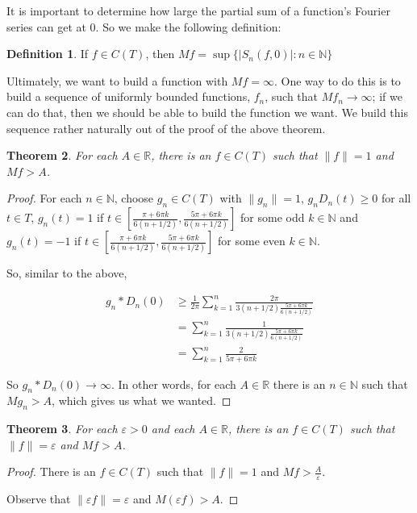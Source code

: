 \documentclass{amsart}
\newcommand{\vep}{\varepsilon}
\newcommand{\N}{\mathbb{N}}
\newcommand{\R}{\mathbb{R}}
\newcommand{\absval}[1]{\left| #1 \right|}
\newcommand{\norm}[1]{\|#1\|}
\newtheorem{thm}{Theorem}[section]
\theoremstyle{definition}
\newtheorem{definition}[thm]{Definition}
\begin{document}
It is important to determine how large the partial sum of a function's Fourier series can get at $0$. 
So we make the following definition:

\begin{definition}
If $f \in C(T)$, then $Mf = \sup\{\absval{S_n(f,0)} : n \in \N\}$ 
\end{definition}

Ultimately, we want to build a function with $Mf = \infty$.
One way to do this is to build a sequence of uniformly bounded functions, $f_n$, such that $Mf_n \to \infty$; 
if we can do that, then we should be able to build the function we want.
We build this sequence rather naturally out of the proof of the above theorem.

\begin{thm}
For each $A \in \R$, there is an $f \in C(T)$ such that $\norm{f} = 1$ and $Mf > A$. 
\end{thm}

\begin{proof}
For each $n \in \N$, choose $g_n \in C(T)$ with $\norm{g_n} = 1$, $g_nD_n(t) \geq 0$ for all $t \in T$,  $g_n(t) = 1$ if $t \in [\frac{\pi +6\pi k}{6(n+1/2)},\frac{5 \pi+6\pi k}{6(n+1/2)}]$ for some odd $k \in \N$  and $g_n(t) = -1$ if $t \in [\frac{\pi +6\pi k}{6(n+1/2)},\frac{5 \pi+6\pi k}{6(n+1/2)}]$ for some even $k \in \N$.

So, similar to the above,

\begin{align*}
g_n \ast D_n(0) &\geq \frac{1}{2 \pi} \sum\limits_{k=1}^n \frac{2 \pi}{3(n+1/2) \frac{5 \pi+6\pi k}{6(n+1/2)}}\\
&= \sum\limits_{k=1}^n \frac{1}{3(n+1/2) \frac{5 \pi+6\pi k}{6(n+1/2)}}\\
&= \sum\limits_{k=1}^n \frac{2}{5 \pi+6\pi k}
\end{align*}

So $g_n \ast D_n(0) \to \infty$. In other words, for each $A \in \R$ there is an $n \in \N$ such that $Mg_n > A$, which gives us what we wanted.

\end{proof}

\begin{thm}
For each $\vep >0$ and each $A \in \R$, there is an $f \in C(T)$ such that $\norm{f} = \vep $ and $Mf > A$. 

\end{thm}

\begin{proof}
There is an $f \in C(T)$ such that $\norm{f} = 1$ and $Mf > \frac{A}{\vep}$.

Observe that $\norm{\vep f} = \vep$ and $M(\vep f) > A$.

\end{proof}
\end{document}
